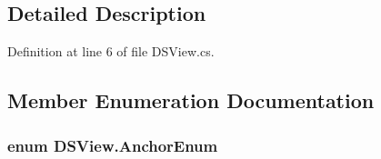 \subsection{Detailed Description}


Definition at line 6 of file D\+S\+View.\+cs.



\subsection{Member Enumeration Documentation}
\hypertarget{class_d_s_view_a8b41b9ec1b18bd33872a37cbd3a2dbe1}{
\subsubsection[{Anchor\+Enum}]{\setlength{\rightskip}{0pt plus 5cm}enum {\bf D\+S\+View.\+Anchor\+Enum}}}\label{class_d_s_view_a8b41b9ec1b18bd33872a37cbd3a2dbe1}
